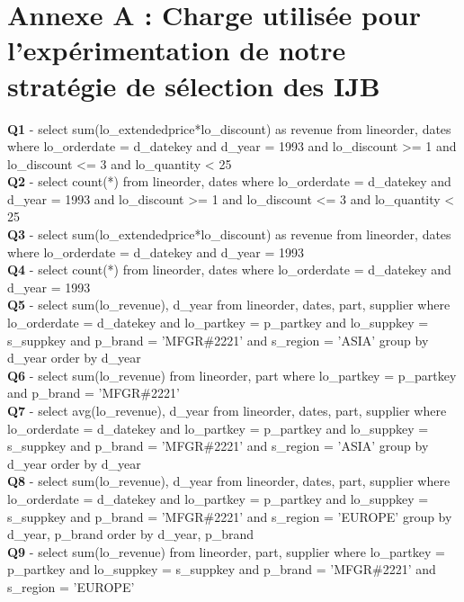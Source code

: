 \chapter*{Annexe A : Charge utilisée pour l’expérimentation de notre stratégie de sélection des IJB}
\textbf{Q1} - select sum(lo\_extendedprice*lo\_discount) as revenue from lineorder, dates where lo\_orderdate = d\_datekey and d\_year = 1993 and lo\_discount >= 1 and lo\_discount <= 3 and lo\_quantity < 25 \\

\textbf{Q2} - select count(*) from lineorder, dates where lo\_orderdate = d\_datekey and d\_year = 1993 and lo\_discount >= 1 and lo\_discount <= 3 and lo\_quantity < 25 \\

\textbf{Q3} - select sum(lo\_extendedprice*lo\_discount) as revenue from lineorder, dates where lo\_orderdate = d\_datekey and d\_year = 1993 \\

\textbf{Q4} - select count(*) from lineorder, dates where lo\_orderdate = d\_datekey and d\_year = 1993 \\

\textbf{Q5} - select sum(lo\_revenue), d\_year from lineorder, dates, part, supplier where lo\_orderdate = d\_datekey and lo\_partkey = p\_partkey and lo\_suppkey = s\_suppkey and p\_brand = 'MFGR\#2221' and s\_region = 'ASIA' group by d\_year order by d\_year \\

\textbf{Q6 }- select sum(lo\_revenue) from lineorder, part where lo\_partkey = p\_partkey and p\_brand = 'MFGR\#2221' \\

\textbf{Q7} - select avg(lo\_revenue), d\_year from lineorder, dates, part, supplier where lo\_orderdate = d\_datekey and lo\_partkey = p\_partkey and lo\_suppkey = s\_suppkey and p\_brand = 'MFGR\#2221' and s\_region = 'ASIA' group by d\_year order by d\_year \\

\textbf{Q8} - select sum(lo\_revenue), d\_year from lineorder, dates, part, supplier where lo\_orderdate = d\_datekey and lo\_partkey = p\_partkey and lo\_suppkey = s\_suppkey and p\_brand = 'MFGR\#2221' and s\_region = 'EUROPE' group by d\_year, p\_brand order by d\_year, p\_brand \\

\textbf{Q9} - select sum(lo\_revenue) from lineorder, part, supplier where lo\_partkey = p\_partkey and lo\_suppkey = s\_suppkey and p\_brand = 'MFGR\#2221' and s\_region = 'EUROPE' \\

